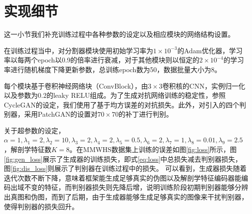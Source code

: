 \section{实现细节}
这一小节我们补充训练过程中各种参数的设定以及相应模块的网络结构设置。

在训练过程当中，对分割器模块使用初始学习率为$1\times 10^{-3}$的Adam优化器，学习率以每两个epoch以0.9的倍率进行衰减，对于其他模块则以恒定的$2\times 10^{-4}$的学习率进行随机梯度下降更新参数，总训练epoch数为50，数据批量大小为8。

每个模块基于卷积神经网络块（ConvBlock），由$3\times 3$卷积核的CNN，实例归一化以及参数为$0.2$的leaky RELU组成。为了生成对抗网络训练的稳定性，参照CycleGAN的设定，我们使用了基于均方误差的对抗损失。此外，对引入的四个判别器，采用PatchGAN\cite{isola2017image}的设置对$70\times 70$的补丁进行判别。

关于超参数的设定，$\alpha=1, \lambda_1=2, \lambda_2=10, \lambda_3=2, \lambda_4=2, \lambda_5=0.5, \lambda_6=2, \lambda_7=1, \lambda_8=0.01, \lambda_9=2.5$，解剖学特征数$K=8$。在MMWHS数据集上训练的误差如图\ref{fig:loss}所示，图\ref{fig:gen_loss}展示了生成器的训练损失，即式\ref{eq:loss}中总损失减去判别器损失，图\ref{fig:dis_loss}则展示了判别器在训练过程中的损失。
可以看到，生成器损失随着迭代次数不断下降，意味着框架能生成足够真实的伪图以及解剖学特征编码器能编码出域不变的特征，而判别器损失则先降后增，说明训练阶段初期判别器能够分辨出真图和伪图，而到了后期，由于生成器能够生成足够真实的图像来干扰判别器，使得判别器的损失回升。

